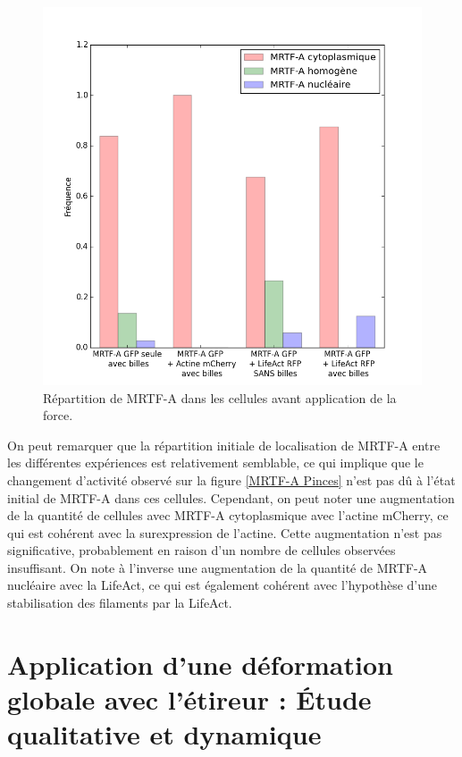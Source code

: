 \begin{figure}
\includegraphics[scale=0.4]{Figures/CHN_pinces.png} 
\caption{Répartition de MRTF-A dans les cellules avant application de la force. \label{CHN_pinces}}
\end{figure}

On peut remarquer que la répartition initiale de localisation de MRTF-A entre les différentes expériences est relativement semblable, ce qui implique que le changement d'activité observé sur la figure \ref{MRTF-A Pinces} n'est pas dû à l'état initial de MRTF-A dans ces cellules. 
Cependant, on peut noter une augmentation de la quantité de cellules avec MRTF-A cytoplasmique avec l'actine mCherry, ce qui est cohérent avec la surexpression de l'actine. Cette augmentation n'est pas significative, probablement en raison d'un nombre de cellules observées insuffisant. On note à l'inverse une augmentation de la quantité de MRTF-A nucléaire avec la LifeAct, ce qui est également cohérent avec l'hypothèse d'une stabilisation des filaments par la LifeAct. 

\section{Application d'une déformation globale avec l'étireur : \'Etude qualitative et dynamique}

